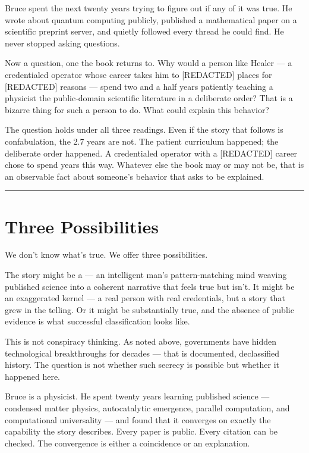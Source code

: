 Bruce spent the next twenty years trying to figure out if any of it was true. He wrote about quantum computing publicly, published a mathematical paper on a scientific preprint server, and quietly followed every thread he could find. He never stopped asking questions.

Now a question, one the book returns to. Why would a person like Healer --- a credentialed operator whose career takes him to [REDACTED] places for [REDACTED] reasons --- spend two and a half years patiently teaching a physicist the public-domain scientific literature in a deliberate order? That is a bizarre thing for such a person to do. What could explain this behavior?

The question holds under all three readings. Even if the story that follows is confabulation, the 2.7 years are not. The patient curriculum happened; the deliberate order happened. A credentialed operator with a [REDACTED] career chose to spend years this way. Whatever else the book may or may not be, that is an observable fact about someone's behavior that asks to be explained.

\vspace{1cm}\noindent\rule{0.5\textwidth}{0.5pt}\vspace{0.5cm}

\section*{Three Possibilities}
\label{front:three-possibilities}

We don't know what's true. We offer three possibilities.

The story might be a  --- an intelligent man's pattern-matching mind weaving published science into a coherent narrative that feels true but isn't. It might be an exaggerated kernel --- a real person with real credentials, but a story that grew in the telling. Or it might be substantially true, and the absence of public evidence is what successful classification looks like.

This is not conspiracy thinking. As noted above, governments have hidden technological breakthroughs for decades --- that is documented, declassified history. The question is not whether such secrecy is possible but whether it happened here.

Bruce is a physicist. He spent twenty years learning published science --- condensed matter physics, autocatalytic emergence, parallel computation, and computational universality --- and found that it converges on exactly the capability the story describes. Every paper is public. Every citation can be checked. The convergence is either a coincidence or an explanation.

